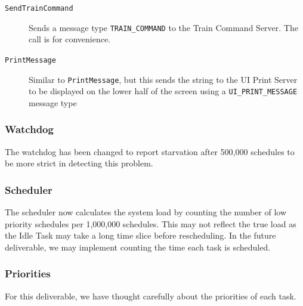 \documentclass[letterpaper]{article}
\begin{document}
\begin{description}
\item[{\texttt{SendTrainCommand}}] \leavevmode 
Sends a message type \texttt{TRAIN\_COMMAND} to the Train Command Server. The call is for convenience.

\item[{\texttt{PrintMessage}}] \leavevmode 
Similar to \texttt{PrintMessage}, but this sends the string to the UI Print Server to be displayed on the lower half of the screen using a \texttt{UI\_PRINT\_MESSAGE} message type

\end{description}


\subsubsection{Watchdog%
  \label{watchdog}%
}

The watchdog has been changed to report starvation after 500,000 schedules to be more strict in detecting this problem.


\subsubsection{Scheduler%
  \label{scheduler}%
}

The scheduler now calculates the system load by counting the number of low priority schedules per 1,000,000 schedules. This may not reflect the true load as the Idle Task may take a long time slice before rescheduling. In the future deliverable, we may implement counting the time each task is scheduled.


\subsubsection{Priorities%
  \label{priorities}%
}

For this deliverable, we have thought carefully about the priorities of each task.
\end{document}

